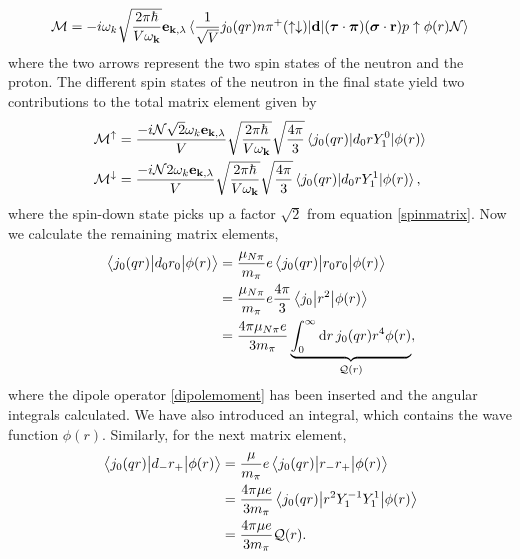 \begin{align}
	\mathcal{M} =-i\omega_k\sqrt{\frac{2\pi\hbar}{V\omega_{\bm{\mathrm{k}}}}}\bm{\mathrm{e}}_{\bm{\mathrm{k}},\lambda}\mel*{\frac{1}{\sqrt{V}} j_0(qr)n\pi^+ (\uparrow \downarrow)}{\bm{\mathrm{d}}}{(\bm{\mathrm{\tau}}\cdot \bm{\mathrm{\pi}})(\bm{\mathrm{\sigma}}\cdot \bm{\mathrm{r}})p\uparrow \phi(r)\mathcal{N}}
\end{align}
where the two arrows represent the two spin states of the neutron and the proton. The different spin states of the neutron in the final state yield two contributions to the total matrix element given by
\begin{align}
	\mathcal{M}^{\uparrow} %
	&= \frac{-i\mathcal{N}\sqrt{2}\omega_k\vec{e}_{\vec{k},\lambda}}{V}\sqrt{\frac{2\pi\hbar}{V\omega_{\vec{k}}}}\sqrt{\frac{4\pi}{3}}\mel*{j_0(qr)}{d_0 r Y_1^0}{\phi(r)} \\
	\mathcal{M}^{\downarrow}  %
	&=\frac{-i\mathcal{N}2\omega_k\vec{e}_{\vec{k},\lambda}}{V}\sqrt{\frac{2\pi\hbar}{V\omega_{\vec{k}}}}\sqrt{\frac{4\pi}{3}}\mel*{j_0(qr)}{d_0 r Y_1^1}{\phi(r)}, \\
\end{align}
where the spin-down state picks up a factor $\sqrt{2}$ from equation \eqref{spinmatrix}. Now we calculate the remaining matrix elements,
\begin{align}
	\mel{j_0(qr)}{d_0 r_0}{\phi(r)} &= \frac{\mu_{N\pi}}{m_\pi}e \mel{j_0(qr)}{r_0r_0}{\phi(r)} \\
	&= \frac{\mu_{N\pi}}{m_\pi}e\frac{4\pi}{3} \mel{j_0}{r^2}{\phi(r)} \\
	&= \frac{4\pi \mu_{N\pi} e}{3m_\pi} \underbrace{\int_0^\infty \text{d}r \, j_0(qr)r^4\phi(r)}_{\mathcal{Q}(r)}, \label{Matrix1}
\end{align}
where the dipole operator \eqref{dipolemoment} has been inserted and the angular integrals calculated. We have also introduced an integral, which contains the wave function $\phi(r)$. Similarly, for the next matrix element,
\begin{align}
	\mel{j_0(qr)}{d_{-}r_{+}}{\phi(r)} &= \frac{\mu}{m_\pi}e \mel{j_0(qr)}{r_{-}r_{+}}{\phi(r)} \\
	&= \frac{4\pi \mu e}{3 m_\pi} \mel{j_0(qr)}{r^2 Y_1^{-1}Y_1^1}{\phi(r)} \\
	&= \frac{4\pi \mu e}{3 m_\pi} \mathcal{Q}(r). \label{Matrix2}
\end{align}
